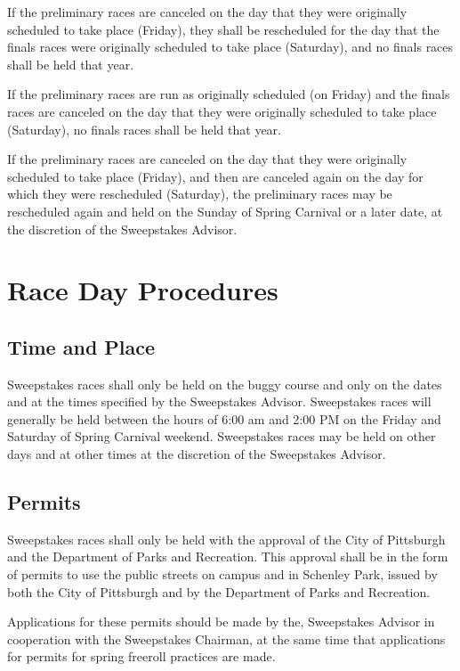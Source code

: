 \documentclass[openany]{book}
\begin{document}
If the preliminary races are canceled on the day that they were originally scheduled to take place (Friday), they shall be rescheduled for the day that the finals races were originally scheduled to take place (Saturday), and no finals races shall be held that year.

If the preliminary races are run as originally scheduled (on Friday) and the finals races are canceled on the day that they were originally scheduled to take place (Saturday), no finals races shall be held that year.

If the preliminary races are canceled on the day that they were originally scheduled to take place (Friday), and then are canceled again on the day for which they were rescheduled (Saturday), the preliminary races may be rescheduled again and held on the Sunday of Spring Carnival or a later date, at the discretion of the Sweepstakes Advisor.

\section{Race Day Procedures}

\subsection{Time and Place}

Sweepstakes races shall only be held on the buggy course and only on the dates and at the times specified by the Sweepstakes Advisor. Sweepstakes races will generally be held between the hours of 6:00 am and 2:00 PM on the Friday and Saturday of Spring Carnival weekend. Sweepstakes races may be held on other days and at other times at the discretion of the Sweepstakes Advisor.

\subsection{Permits}

Sweepstakes races shall only be held with the approval of the City of Pittsburgh and the Department of Parks and Recreation. This approval shall be in the form of permits to use the public streets on campus and in Schenley Park, issued by both the City of Pittsburgh and by the Department of Parks and Recreation.

Applications for these permits should be made by the, Sweepstakes Advisor in cooperation with the Sweepstakes Chairman, at the same time that applications for permits for spring freeroll practices are made.
\end{document}
